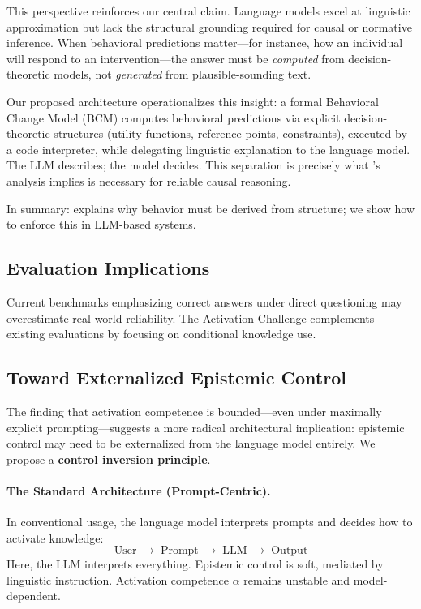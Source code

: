 \documentclass[11pt,a4paper]{article}
\begin{document}
This perspective reinforces our central claim. Language models excel at linguistic approximation but lack the structural grounding required for causal or normative inference. When behavioral predictions matter---for instance, how an individual will respond to an intervention---the answer must be \emph{computed} from decision-theoretic models, not \emph{generated} from plausible-sounding text.

Our proposed architecture operationalizes this insight: a formal Behavioral Change Model (BCM) computes behavioral predictions via explicit decision-theoretic structures (utility functions, reference points, constraints), executed by a code interpreter, while delegating linguistic explanation to the language model. The LLM describes; the model decides. This separation is precisely what \citeauthor{kasy2026causality}'s analysis implies is necessary for reliable causal reasoning.

In summary: \citeauthor{kasy2026causality} explains why behavior must be derived from structure; we show how to enforce this in LLM-based systems.

\subsection{Evaluation Implications}

Current benchmarks emphasizing correct answers under direct questioning may overestimate real-world reliability. The Activation Challenge complements existing evaluations by focusing on conditional knowledge use.

\subsection{Toward Externalized Epistemic Control}

The finding that activation competence is bounded---even under maximally explicit prompting---suggests a more radical architectural implication: epistemic control may need to be externalized from the language model entirely. We propose a \textbf{control inversion principle}.

\paragraph{The Standard Architecture (Prompt-Centric).}
In conventional usage, the language model interprets prompts and decides how to activate knowledge:
\[
\text{User} \;\rightarrow\; \text{Prompt} \;\rightarrow\; \text{LLM} \;\rightarrow\; \text{Output}
\]
Here, the LLM interprets everything. Epistemic control is soft, mediated by linguistic instruction. Activation competence $\alpha$ remains unstable and model-dependent.
\end{document}
